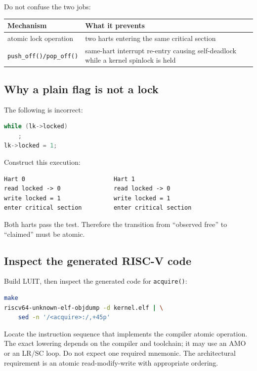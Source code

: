 \documentclass[11pt,a4paper]{article}
\newcommand{\file}[1]{\texttt{#1}}
\begin{document}
Do not confuse the two jobs:

\begin{center}
\begin{tabularx}{0.92\textwidth}{@{}p{42mm}X@{}}
\toprule
\textbf{Mechanism} & \textbf{What it prevents} \\
\midrule
atomic lock operation & two harts entering the same critical section \\
\file{push\_off()/pop\_off()} & same-hart interrupt re-entry causing self-deadlock while a kernel spinlock is held \\
\bottomrule
\end{tabularx}
\end{center}

\subsection{Why a plain flag is not a lock}

The following is incorrect:

\begin{lstlisting}[language=C]
while (lk->locked)
    ;
lk->locked = 1;
\end{lstlisting}

Construct this execution:

\begin{lstlisting}
Hart 0                         Hart 1
read locked -> 0               read locked -> 0
write locked = 1               write locked = 1
enter critical section         enter critical section
\end{lstlisting}

Both harts pass the test. Therefore the transition from ``observed free'' to ``claimed'' must be atomic.

\subsection{Inspect the generated RISC-V code}

Build LUIT, then inspect the generated code for \file{acquire()}:

\begin{lstlisting}[language=bash]
make
riscv64-unknown-elf-objdump -d kernel.elf | \
    sed -n '/<acquire>:/,+45p'
\end{lstlisting}

Locate the instruction sequence that implements the compiler atomic operation. The exact lowering depends on the compiler and toolchain; it may use an AMO or an LR/SC loop. Do not expect one required mnemonic. The architectural requirement is an atomic read-modify-write with appropriate ordering.
\end{document}
